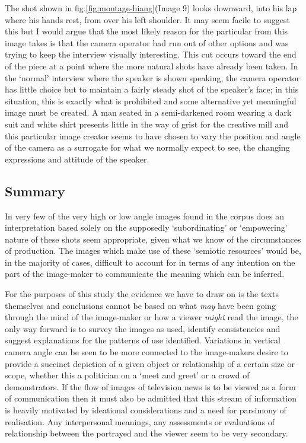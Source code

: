 The shot shown in fig.\ref{fig:montage-hiang}(Image 9) looks downward, into his lap where his hands rest, from over his left shoulder. It may seem facile to suggest this but I would argue that the most likely reason for the particular from this image takes is that the camera operator had run out of other options and was trying to keep the interview visually interesting. This cut occurs toward the end of the piece at a point where the more natural shots have already been taken. In the `normal' interview where the speaker is shown speaking, the camera operator has little choice but to maintain a fairly steady shot of the speaker's face; in this situation, this is exactly what is prohibited and some alternative yet meaningful image must be created. A man seated in a semi-darkened room wearing a dark suit and white shirt presents little in the way of grist for the creative mill and this particular image creator seems to have chosen to vary the position and angle of the camera as a surrogate for what we normally expect to see, the changing expressions and attitude of the speaker.

\subsection{Summary}
In very few of the very high or low angle images found in the corpus does an interpretation based solely on the supposedly `subordinating' or `empowering' nature of these shots seem appropriate, given what we know of the circumstances of production. The images which make use of these `semiotic resources' would be, in the majority of cases, difficult to account for in terms of any intention on the part of the image-maker to communicate the meaning which can be inferred. 

For the purposes of this study the evidence we have to draw on is the texts themselves and conclusions cannot be based  on what \textit{may} have been going through the mind of the image-maker or how a viewer \textit{might} read the image, the only way forward is to survey the images as used, identify consistencies and suggest explanations for the patterns of use identified. Variations in vertical camera angle can be seen to be more connected to the image-makers desire to provide a succinct depiction of a given object or relationship of a certain size or scope, whether this a politician on a `meet and greet' or a crowd of demonstrators. If the flow of images of television news is to be viewed as a form of communication then it must also be admitted that this stream of information is heavily motivated by ideational considerations and a need for parsimony of realisation. Any interpersonal meanings, any assessments or evaluations of relationship between the portrayed and the viewer seem to be very secondary.

